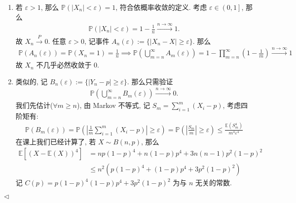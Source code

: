 \documentclass[11pt]{article}
\newenvironment{answer}[1][Solution]{\begin{trivlist}
    \item[\hskip \labelsep {\bfseries #1.}\hskip \labelsep]}{\hfill$\lhd$\end{trivlist}}
\newcommand\1{\mathds{1}}
\newcommand\E{\mathbb{E}}
\newcommand\PP{\mathbb{P}}
\newcommand{\arrp}{\xrightarrow{P}}
\newcommand{\arri}{\xrightarrow{n\rightarrow\infty}}
\begin{document}
\begin{answer}
    \begin{enumerate}[label=(\arabic*)]
        \item 若 $\varepsilon > 1$, 那么 $\PP(|X_n| < \varepsilon) = 1$, 符合依概率收敛的定义. 考虑 $\varepsilon \in \left(0,1\right]$, 那么
        \begin{align*}
            \PP(|X_n| < \varepsilon) = 1 - \frac{1}{n} \arri 1.
        \end{align*}
        故 $X_n \arrp 0$. 任意 $\varepsilon > 0$, 记事件 $A_n(\varepsilon) := \{|X_n - X| \ge \varepsilon\}$. 那么
        \begin{align*}
            \PP(A_n(\varepsilon)) = \PP(X_n = 1) = \frac{1}{n} \implies \PP\left(\bigcup_{m=n}^\infty A_m(\varepsilon)\right) = 1 - \prod_{m=n}^{\infty} \left(1 - \frac{1}{m}\right) \arri 1
        \end{align*}
        故 $X_n$ 不几乎必然收敛于 $0$.
        \item 类似的, 记 $B_n(\varepsilon) := \{|Y_n - p| \ge \varepsilon\}$. 那么只需验证
        \begin{align*}
            \PP\left( \bigcup_{m=n}^\infty B_m(\varepsilon) \right) \arri 0.
        \end{align*}
        我们先估计($\forall m \ge n$), 由 Markov 不等式, 记 $S_m = \sum_{i=1}^{m}(X_i - p)$, 考虑四阶矩有: 
        \begin{align*}
            \PP(B_m(\varepsilon)) = \PP\left(\left|\frac{1}{m} \sum_{i=1}^m (X_i - p)\right|  \ge \varepsilon\right) = \PP\left(\left|\frac{S_m}{m}\right| \ge \varepsilon \right) \le \frac{\E(S_m^4)} {m^4\varepsilon^4} 
        \end{align*}
        在课上我们已经计算了, 若 $X\sim B(n, p)$, 那么
        \begin{align*}
            \E[(X - \E(X))^4] &= np(1-p)^4+n(1-p) p^4+3n(n-1) p^2 (1-p)^2 \\
            &\le n^2 \left(p(1-p)^4 + (1-p)p^4 + 3p^2(1-p)^2\right) 
        \end{align*}
        记 $C(p) = p(1-p)^4 (1-p)p^4 + 3p^2(1-p)^2$ 为与 $n$ 无关的常数.


\end{enumerate}
\end{answer}
\end{document}

